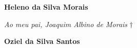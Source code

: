 \begin{dedicatoria}
   \textbf{Heleno da Silva Morais}
   \vspace*{\fill}
   \begin{flushright}
   	\textit{Ao meu pai, Joaquim Albino de Morais} $\dagger$\\
   \end{flushright}
	
   \textbf{Oziel da Silva Santos}
   \noindent
   \vspace*{\fill}
   
   
\end{dedicatoria}
